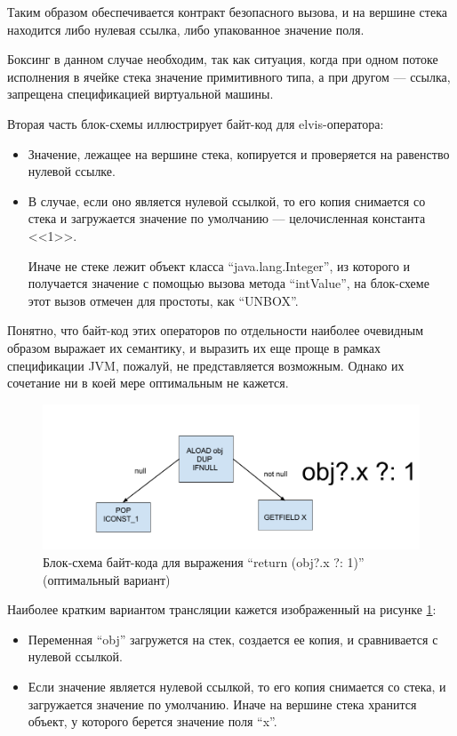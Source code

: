 Таким образом обеспечивается контракт безопасного вызова, и на вершине стека находится либо нулевая
ссылка, либо упакованное значение поля.

Боксинг в данном случае необходим, так как ситуация, когда при одном потоке исполнения в ячейке
стека значение примитивного типа, а при другом --- ссылка, запрещена спецификацией виртуальной
машины\cite{JVMSpec}.

Вторая часть блок-схемы иллюстрирует байт-код для elvis-оператора:
\begin{itemize}
    \item Значение, лежащее на вершине стека, копируется и проверяется на равенство нулевой ссылке.
    \item В случае, если оно является нулевой ссылкой, то его копия снимается со стека и
    загружается значение по умолчанию --- целочисленная константа <<1>>.

    Иначе не стеке лежит объект класса ``java.lang.Integer'', из которого и получается значение
    с помощью вызова метода ``intValue'', на блок-схеме этот вызов отмечен для простоты, как
    ``UNBOX''.
\end{itemize}

Понятно, что байт-код этих операторов по отдельности наиболее очевидным образом выражает
их семантику, и выразить их еще проще в рамках спецификации JVM, пожалуй, не представляется
возможным.
Однако их сочетание ни в коей мере оптимальным не кажется.

\begin{figure}
\begin{center}
    \includegraphics[scale=0.4]{../resources/safecall_elvis_optim.png}
\end{center}
\caption{Блок-схема байт-кода для выражения ``return (obj?.x ?: 1)'' (оптимальный вариант)}
\label{sc:elvisOpt}
\end{figure}

Наиболее кратким вариантом трансляции кажется изображенный на рисунке \ref{sc:elvisOpt}:
\begin{itemize}
    \item Переменная ``obj'' загружется на стек, создается ее копия, и сравнивается с нулевой
    ссылкой.
    \item Если значение является нулевой ссылкой, то его копия снимается со стека, и загружается
    значение по умолчанию.
    Иначе на вершине стека хранится объект, у которого берется значение поля ``x''.
\end{itemize}

